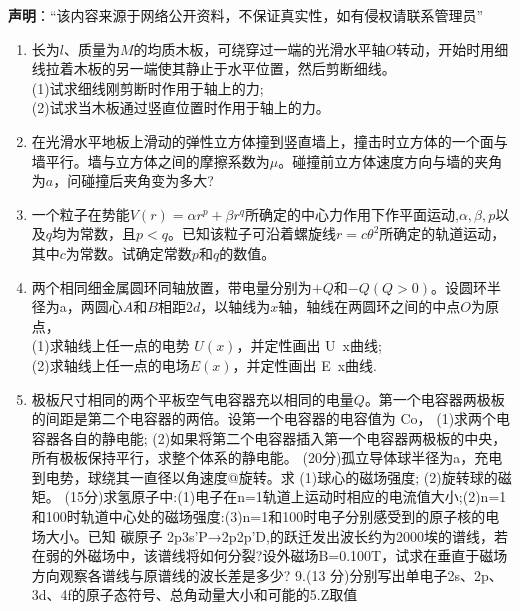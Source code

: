 
\textbf{声明}：“该内容来源于网络公开资料，不保证真实性，如有侵权请联系管理员”
\begin{enumerate}
\item 长为$l$、质量为$M$的均质木板，可绕穿过一端的光滑水平轴$O$转动，开始时用细线拉着木板的另一端使其静止于水平位置，然后剪断细线。\\
(1)试求细线刚剪断时作用于轴上的力;\\
(2)试求当木板通过竖直位置时作用于轴上的力。
\item 在光滑水平地板上滑动的弹性立方体撞到竖直墙上，撞击时立方体的一个面与墙平行。墙与立方体之间的摩擦系数为$\mu$。碰撞前立方体速度方向与墙的夹角为$a$，问碰撞后夹角变为多大?
\item 一个粒子在势能$V(r)=\alpha r^p+\beta r^q$所确定的中心力作用下作平面运动,$\alpha,\beta,p$以及$q$均为常数，且$p<q$。已知该粒子可沿着螺旋线$r=c\theta^2$所确定的轨道运动，其中$c$为常数。试确定常数$p$和$q$的数值。
\item 两个相同细金属圆环同轴放置，带电量分别为$+Q$和$-Q(Q>0)$。设圆环半径为a，两圆心$A$和$B$相距$2d$，以轴线为$x$轴，轴线在两圆环之间的中点$O$为原点，\\
(1)求轴线上任一点的电势 $U(x)$，并定性画出 U~x曲线;\\
(2)求轴线上任一点的电场$E(x)$，并定性画出 E~x曲线.
\item 极板尺寸相同的两个平板空气电容器充以相同的电量$Q$。第一个电容器两极板的间距是第二个电容器的两倍。设第一个电容器的电容值为 Co，
(1)求两个电容器各自的静电能;
(2)如果将第二个电容器插入第一个电容器两极板的中央，所有极板保持平行，求整个体系的静电能。
(20分)孤立导体球半径为a，充电到电势，球绕其一直径以角速度@旋转。求
(1)球心的磁场强度;
(2)旋转球的磁矩。
(15分)求氢原子中:(1)电子在n=1轨道上运动时相应的电流值大小;(2)n=1和100时轨道中心处的磁场强度:(3)n=1和100时电子分别感受到的原子核的电场大小。已知
碳原子 2p3s'P→2p2p'D,的跃迁发出波长约为2000埃的谱线，若在弱的外磁场中，该谱线将如何分裂?设外磁场B=0.100T，试求在垂直于磁场方向观察各谱线与原谱线的波长差是多少?
9.(13 分)分别写出单电子2s、2p、3d、4f的原子态符号、总角动量大小和可能的5.Z取值
\end{enumerate}